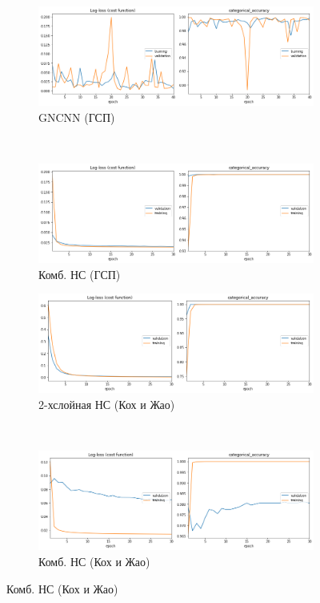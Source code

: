 \begin{figure}[p]
    \centering
    \begin{subfigure}[b]{0.485\textwidth}
        \includegraphics[width=\textwidth]{include/graphics/experimental_plots/color/gncnn_hic}
                            \caption{GNCNN (ГСП)}
    \end{subfigure}
    ~
    \begin{subfigure}[b]{0.485\textwidth}
        \includegraphics[width=\textwidth]{include/graphics/experimental_plots/color/mixed_hic}
                            \caption{Комб. НС (ГСП)}
    \end{subfigure}
\bigskip
    \begin{subfigure}[b]{0.485\textwidth}
        \includegraphics[width=\textwidth]{include/graphics/experimental_plots/color/french_koch}
                            \caption{2-хслойная НС (Кох и Жао)}
    \end{subfigure}
    ~
    \begin{subfigure}[b]{0.485\textwidth}
        \includegraphics[width=\textwidth]{include/graphics/experimental_plots/color/mixed_koch}
                                    \caption{Комб. НС (Кох и Жао)}
    \end{subfigure}
    

\end{figure}
